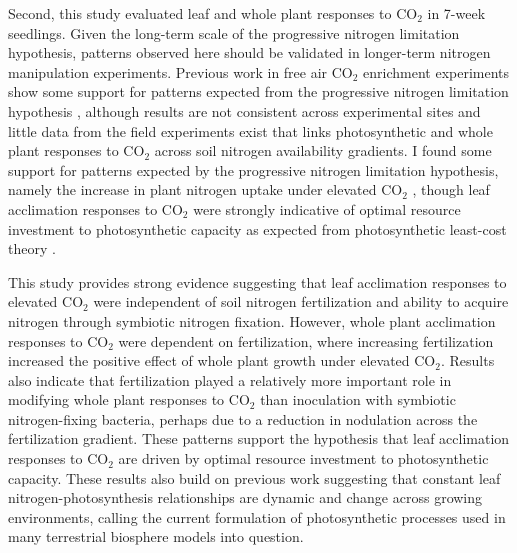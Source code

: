 Second, this study evaluated leaf and whole plant responses to CO$_2$ in 7-week seedlings. Given the long-term scale of the progressive nitrogen limitation hypothesis, patterns observed here should be validated in longer-term nitrogen manipulation experiments. Previous work in free air CO$_2$ enrichment experiments show some support for patterns expected from the progressive nitrogen limitation hypothesis , although results are not consistent across experimental sites  and little data from the field experiments exist that links photosynthetic and whole plant responses to CO$_2$ across soil nitrogen availability gradients. I found some support for patterns expected by the progressive nitrogen limitation hypothesis, namely the increase in plant nitrogen uptake under elevated CO$_2$ , though leaf acclimation responses to CO$_2$ were strongly indicative of optimal resource investment to photosynthetic capacity as expected from photosynthetic least-cost theory .

This study provides strong evidence suggesting that leaf acclimation responses to elevated CO$_2$ were independent of soil nitrogen fertilization and ability to acquire nitrogen through symbiotic nitrogen fixation. However, whole plant acclimation responses to CO$_2$ were dependent on fertilization, where increasing fertilization increased the positive effect of whole plant growth under elevated CO$_2$. Results also indicate that fertilization played a relatively more important role in modifying whole plant responses to CO$_2$ than inoculation with symbiotic nitrogen-fixing bacteria, perhaps due to a reduction in nodulation across the fertilization gradient. These patterns support the hypothesis that leaf acclimation responses to CO$_2$ are driven by optimal resource investment to photosynthetic capacity. These results also build on previous work suggesting that constant leaf nitrogen-photosynthesis relationships are dynamic and change across growing environments, calling the current formulation of photosynthetic processes used in many terrestrial biosphere models into question.
